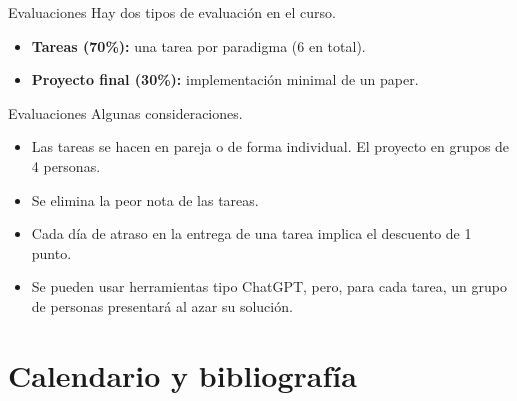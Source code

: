 \documentclass{beamer}
\begin{document}
\begin{frame}{Evaluaciones}
    Hay dos tipos de evaluación en el curso.
    \begin{itemize}
        \item<2,4> \textbf{Tareas (70\%):} una tarea por paradigma (6 en total).
        \item<3,4> \textbf{Proyecto final (30\%):} implementación minimal de un paper.
    \end{itemize}
\end{frame}

\begin{frame}{Evaluaciones}
    Algunas consideraciones.
    \begin{itemize}
        \item<2> Las tareas se hacen en pareja o de forma individual. El proyecto en grupos de 4 personas.
        \item<3> Se elimina la peor nota de las tareas.
        \item<4> Cada día de atraso en la entrega de una tarea implica el descuento de 1 punto.
        \item<5> Se pueden usar herramientas tipo ChatGPT, pero, para cada tarea, un grupo de personas presentará al azar su solución.
    \end{itemize}
\end{frame}

\section{Calendario y bibliografía}
\end{document}
